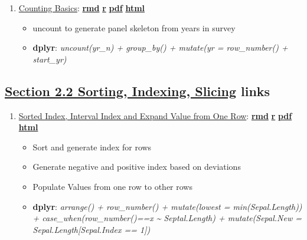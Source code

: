 \documentclass[
]{book}
\providecommand{\tightlist}{%
  \setlength{\itemsep}{0pt}\setlength{\parskip}{0pt}}
\begin{document}
\begin{enumerate}
\def\labelenumi{\arabic{enumi}.}
\tightlist
\item
  \href{https://fanwangecon.github.io/R4Econ/summarize/count/htmlpdfr/fs_count_basics.html}{Counting Basics}: \href{https://github.com/FanWangEcon/R4Econ/blob/master/summarize/count//fs_count_basics.Rmd}{\textbf{rmd}} \textbar{} \href{https://github.com/FanWangEcon/R4Econ/blob/master/summarize/count/htmlpdfr/fs_count_basics.R}{\textbf{r}} \textbar{} \href{https://github.com/FanWangEcon/R4Econ/blob/master/summarize/count/htmlpdfr/fs_count_basics.pdf}{\textbf{pdf}} \textbar{} \href{https://fanwangecon.github.io/R4Econ/summarize/count/htmlpdfr/fs_count_basics.html}{\textbf{html}}

  \begin{itemize}
  \tightlist
  \item
    uncount to generate panel skeleton from years in survey
  \item
    \textbf{dplyr}: \emph{uncount(yr\_n) + group\_by() + mutate(yr = row\_number() + start\_yr)}
  \end{itemize}
\end{enumerate}

\hypertarget{section-2.2-sorting-indexing-slicingsorting-indexing-slicing-links}{%
\subsection{\texorpdfstring{\protect\hyperlink{sorting-indexing-slicing}{Section 2.2 Sorting, Indexing, Slicing} links}{Section 2.2 Sorting, Indexing, Slicing links}}\label{section-2.2-sorting-indexing-slicingsorting-indexing-slicing-links}}

\begin{enumerate}
\def\labelenumi{\arabic{enumi}.}
\tightlist
\item
  \href{https://fanwangecon.github.io/R4Econ/summarize/index/htmlpdfr/fs_index_populate.html}{Sorted Index, Interval Index and Expand Value from One Row}: \href{https://github.com/FanWangEcon/R4Econ/blob/master/summarize/index//fs_index_populate.Rmd}{\textbf{rmd}} \textbar{} \href{https://github.com/FanWangEcon/R4Econ/blob/master/summarize/index/htmlpdfr/fs_index_populate.R}{\textbf{r}} \textbar{} \href{https://github.com/FanWangEcon/R4Econ/blob/master/summarize/index/htmlpdfr/fs_index_populate.pdf}{\textbf{pdf}} \textbar{} \href{https://fanwangecon.github.io/R4Econ/summarize/index/htmlpdfr/fs_index_populate.html}{\textbf{html}}

  \begin{itemize}
  \tightlist
  \item
    Sort and generate index for rows
  \item
    Generate negative and positive index based on deviations
  \item
    Populate Values from one row to other rows
  \item
    \textbf{dplyr}: \emph{arrange() + row\_number() + mutate(lowest = min(Sepal.Length)) + case\_when(row\_number()==x \textasciitilde{} Septal.Length) + mutate(Sepal.New = Sepal.Length{[}Sepal.Index == 1{]})}
  \end{itemize}
\end{enumerate}
\end{document}
